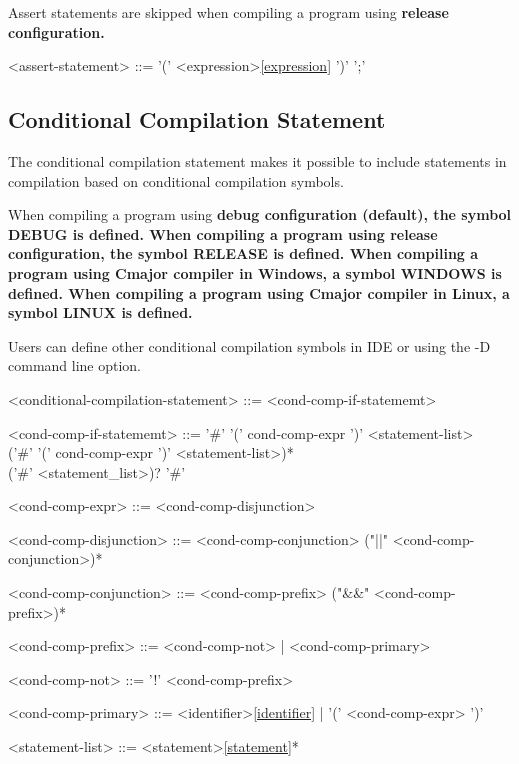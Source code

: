 \documentclass[a4paper,oneside,11pt]{article}
\begin{document}
Assert statements are skipped when compiling a program using \bf{release} configuration.

\begin{grammar}
\label{assert-statement}<assert-statement> ::=  '(' <expression>\ref{expression} ')' ';'
\end{grammar}

\subsection{Conditional Compilation Statement}

The conditional compilation statement makes it possible to include statements in compilation
based on conditional compilation symbols.

When compiling a program using \bf{debug} configuration (default), the symbol DEBUG is defined.
When compiling a program using \bf{release} configuration, the symbol RELEASE is defined.
When compiling a program using Cmajor compiler in Windows, a symbol WINDOWS is defined.
When compiling a program using Cmajor compiler in Linux, a symbol LINUX is defined.

Users can define other conditional compilation symbols in IDE or using the -D command line option.

\begin{grammar}
\label{conditional-compilation-statement}<conditional-compilation-statement> ::= <cond-comp-if-statememt>

<cond-comp-if-statememt> ::= '\#'  '(' cond-comp-expr ')' <statement-list>\\
('\#'  '(' cond-comp-expr ')' <statement-list>)*\\
('\#'  <statement_list>)? '\#' 

<cond-comp-expr> ::= <cond-comp-disjunction>

<cond-comp-disjunction> ::= <cond-comp-conjunction> ("||" <cond-comp-conjunction>)*

<cond-comp-conjunction> ::= <cond-comp-prefix> ("&&" <cond-comp-prefix>)*

<cond-comp-prefix> ::= <cond-comp-not> | <cond-comp-primary>

<cond-comp-not> ::= '!' <cond-comp-prefix>

<cond-comp-primary> ::= <identifier>\ref{identifier} | '(' <cond-comp-expr> ')'

<statement-list> ::= <statement>\ref{statement}*
\end{grammar}
\end{document}
